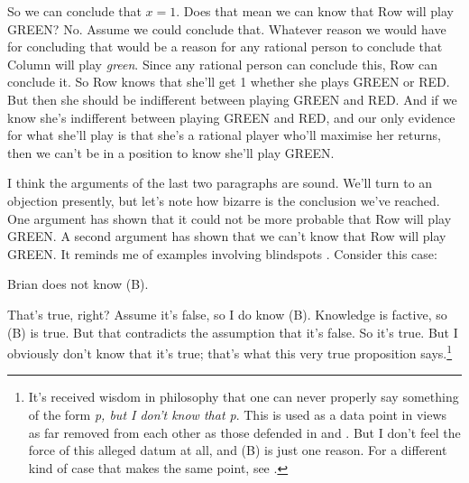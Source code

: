 So we can conclude that $x = 1$. Does that mean we can know that Row will play GREEN? No. Assume we could conclude that. Whatever reason we would have for concluding that would be a reason for any rational person to conclude that Column will play \textit{green}. Since any rational person can conclude this, Row can conclude it. So Row knows that she'll get 1 whether she plays GREEN or RED. But then she should be indifferent between playing GREEN and RED. And if we know she's indifferent between playing GREEN and RED, and our only evidence for what she'll play is that she's a rational player who'll maximise her returns, then we can't be in a position to know she'll play GREEN.

I think the arguments of the last two paragraphs are sound. We'll turn to an objection presently, but let's note how bizarre is the conclusion we've reached. One argument has shown that it could not be more probable that Row will play GREEN. A second argument has shown that we can't know that Row will play GREEN. It reminds me of examples involving blindspots \citep{Sorensen1988}. Consider this case:

\begin{enumerate*}
\renewcommand{\labelenumi}{(\Alph{enumi})}
\setcounter{enumi}{1}
\item Brian does not know (B).
\end{enumerate*}
That's true, right? Assume it's false, so I do know (B). Knowledge is factive, so (B) is true. But that contradicts the assumption that it's false. So it's true. But I obviously don't know that it's true; that's what this very true proposition says.\footnote{It's received wisdom in philosophy that one can never properly say something of the form \textit{p, but I don't know that p}. This is used as a data point in views as far removed from each other as those defended in \cite{Heal1994} and \cite{Williamson1996-WILKAA}. But I don't feel the force of this alleged datum at all, and (B) is just one reason. For a different kind of case that makes the same point, see \cite{MaitraWeatherson}.}

